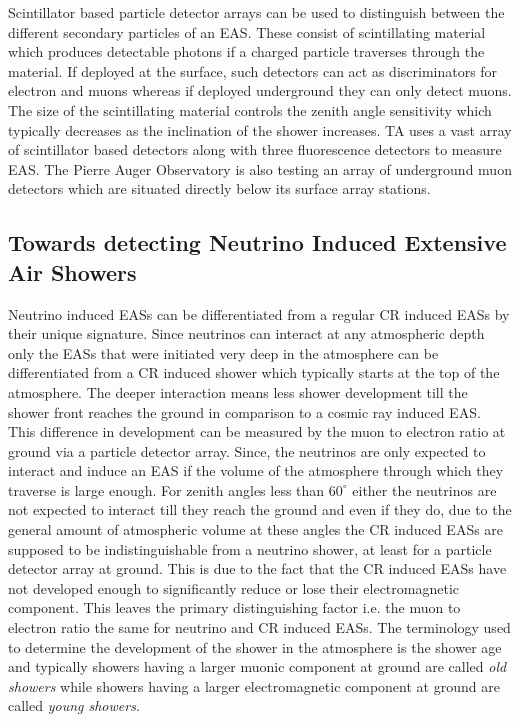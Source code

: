 Scintillator based particle detector arrays can be used to distinguish between the different secondary particles of an EAS. These consist of scintillating material which produces detectable photons if a charged particle traverses through the material. If deployed at the surface, such detectors can act as discriminators for electron and muons whereas if deployed underground they can only detect muons. The size of the scintillating material controls the zenith angle sensitivity which typically decreases as the inclination of the shower increases. TA uses a vast array of scintillator based detectors along with three fluorescence detectors to measure EAS. The Pierre Auger Observatory is also testing an array of underground muon detectors which are situated directly below its surface array stations.


\subsection{Towards detecting Neutrino Induced Extensive Air Showers}
\label{sec:EAS_nu}
Neutrino induced EASs can be differentiated from a regular CR induced EASs by their unique signature. Since neutrinos can interact at any atmospheric depth only the EASs that were initiated very deep in the atmosphere can be differentiated from a CR induced shower which typically starts at the top of the atmosphere. The deeper interaction means less shower development till the shower front reaches the ground in comparison to a cosmic ray induced EAS. This difference in development can be measured by the muon to electron ratio at ground via a particle detector array. Since, the neutrinos are only expected to interact and induce an EAS if the volume of the atmosphere through which they traverse is large enough. For zenith angles less than $60^{\circ}$ either the neutrinos are not expected to interact till they reach the ground and even if they do, due to the general amount of atmospheric volume at these angles the CR induced EASs are supposed to be indistinguishable from a neutrino shower, at least for a particle detector array at ground. This is due to the fact that the CR induced EASs have not developed enough to significantly reduce or lose their electromagnetic component. This leaves the primary distinguishing factor i.e. the muon to electron ratio the same for neutrino and CR induced EASs. The terminology used to determine the development of the shower in the atmosphere is the shower age and typically showers having a larger muonic component at ground are called \textit{old showers} while showers having a larger electromagnetic component at ground are called \textit{young showers}. 

